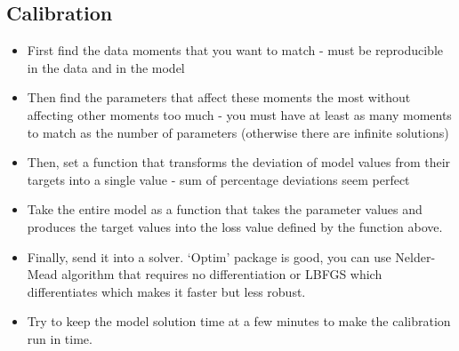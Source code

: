 \documentclass[12pt]{article}
\begin{document}
\subsection*{Calibration}
\begin{itemize}\setlength\itemsep{0em} \small
    \item First find the data moments that you want to match - must be reproducible in the data and in the model
    \item Then find the parameters that affect these moments the most without affecting other moments too much - you must have at least as many moments to match as the number of parameters (otherwise there are infinite solutions)
    \item Then, set a function that transforms the deviation of model values from their targets into a single value - sum of percentage deviations seem perfect
    \item Take the entire model as a function that takes the parameter values and produces the target values into the loss value defined by the function above. 
    \item Finally, send it into a solver. `Optim' package is good, you can use Nelder-Mead algorithm that requires no differentiation or LBFGS which differentiates which makes it faster but less robust.
    \item Try to keep the model solution time at a few minutes to make the calibration run in time. 
\end{itemize} \normalsize


\newpage
\end{document}
